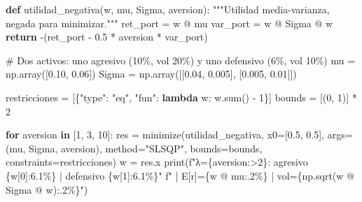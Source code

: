 \documentclass[
  spanish,
  letterpaper,
  DIV=11,
  numbers=noendperiod]{scrreprt}
\newenvironment{Shaded}{\begin{snugshade}}{\end{snugshade}}
\newcommand{\BuiltInTok}[1]{\textcolor[rgb]{0.00,0.23,0.31}{#1}}
\newcommand{\CommentTok}[1]{\textcolor[rgb]{0.37,0.37,0.37}{#1}}
\newcommand{\ControlFlowTok}[1]{\textcolor[rgb]{0.00,0.23,0.31}{\textbf{#1}}}
\newcommand{\DecValTok}[1]{\textcolor[rgb]{0.68,0.00,0.00}{#1}}
\newcommand{\FloatTok}[1]{\textcolor[rgb]{0.68,0.00,0.00}{#1}}
\newcommand{\KeywordTok}[1]{\textcolor[rgb]{0.00,0.23,0.31}{\textbf{#1}}}
\newcommand{\NormalTok}[1]{\textcolor[rgb]{0.00,0.23,0.31}{#1}}
\newcommand{\OperatorTok}[1]{\textcolor[rgb]{0.37,0.37,0.37}{#1}}
\newcommand{\SpecialCharTok}[1]{\textcolor[rgb]{0.37,0.37,0.37}{#1}}
\newcommand{\SpecialStringTok}[1]{\textcolor[rgb]{0.13,0.47,0.30}{#1}}
\newcommand{\StringTok}[1]{\textcolor[rgb]{0.13,0.47,0.30}{#1}}
\begin{document}
\label{minimize-restricciones}
\begin{Shaded}
\begin{Highlighting}[]
\KeywordTok{def}\NormalTok{ utilidad\_negativa(w, mu, Sigma, aversion):}
    \CommentTok{"""Utilidad media{-}varianza, negada para minimizar."""}
\NormalTok{    ret\_port }\OperatorTok{=}\NormalTok{ w }\OperatorTok{@}\NormalTok{ mu}
\NormalTok{    var\_port }\OperatorTok{=}\NormalTok{ w }\OperatorTok{@}\NormalTok{ Sigma }\OperatorTok{@}\NormalTok{ w}
    \ControlFlowTok{return} \OperatorTok{{-}}\NormalTok{(ret\_port }\OperatorTok{{-}} \FloatTok{0.5} \OperatorTok{*}\NormalTok{ aversion }\OperatorTok{*}\NormalTok{ var\_port)}

\CommentTok{\# Dos activos: uno agresivo (10\%, vol 20\%) y uno defensivo (6\%, vol 10\%)}
\NormalTok{mu }\OperatorTok{=}\NormalTok{ np.array([}\FloatTok{0.10}\NormalTok{, }\FloatTok{0.06}\NormalTok{])}
\NormalTok{Sigma }\OperatorTok{=}\NormalTok{ np.array([[}\FloatTok{0.04}\NormalTok{, }\FloatTok{0.005}\NormalTok{],}
\NormalTok{                  [}\FloatTok{0.005}\NormalTok{, }\FloatTok{0.01}\NormalTok{]])}

\NormalTok{restricciones }\OperatorTok{=}\NormalTok{ [\{}\StringTok{"type"}\NormalTok{: }\StringTok{"eq"}\NormalTok{, }\StringTok{"fun"}\NormalTok{: }\KeywordTok{lambda}\NormalTok{ w: w.}\BuiltInTok{sum}\NormalTok{() }\OperatorTok{{-}} \DecValTok{1}\NormalTok{\}]}
\NormalTok{bounds }\OperatorTok{=}\NormalTok{ [(}\DecValTok{0}\NormalTok{, }\DecValTok{1}\NormalTok{)] }\OperatorTok{*} \DecValTok{2}

\ControlFlowTok{for}\NormalTok{ aversion }\KeywordTok{in}\NormalTok{ [}\DecValTok{1}\NormalTok{, }\DecValTok{3}\NormalTok{, }\DecValTok{10}\NormalTok{]:}
\NormalTok{    res }\OperatorTok{=}\NormalTok{ minimize(utilidad\_negativa, x0}\OperatorTok{=}\NormalTok{[}\FloatTok{0.5}\NormalTok{, }\FloatTok{0.5}\NormalTok{],}
\NormalTok{                   args}\OperatorTok{=}\NormalTok{(mu, Sigma, aversion),}
\NormalTok{                   method}\OperatorTok{=}\StringTok{"SLSQP"}\NormalTok{, bounds}\OperatorTok{=}\NormalTok{bounds, constraints}\OperatorTok{=}\NormalTok{restricciones)}
\NormalTok{    w }\OperatorTok{=}\NormalTok{ res.x}
    \BuiltInTok{print}\NormalTok{(}\SpecialStringTok{f"λ=}\SpecialCharTok{\{}\NormalTok{aversion}\SpecialCharTok{:\textgreater{}2\}}\SpecialStringTok{: agresivo }\SpecialCharTok{\{}\NormalTok{w[}\DecValTok{0}\NormalTok{]}\SpecialCharTok{:6.1\%\}}\SpecialStringTok{ | defensivo }\SpecialCharTok{\{}\NormalTok{w[}\DecValTok{1}\NormalTok{]}\SpecialCharTok{:6.1\%\}}\SpecialStringTok{"}
          \SpecialStringTok{f" | E[r]=}\SpecialCharTok{\{}\NormalTok{w }\OperatorTok{@}\NormalTok{ mu}\SpecialCharTok{:.2\%\}}\SpecialStringTok{ | vol=}\SpecialCharTok{\{}\NormalTok{np}\SpecialCharTok{.}\NormalTok{sqrt(w }\OperatorTok{@}\NormalTok{ Sigma }\OperatorTok{@}\NormalTok{ w)}\SpecialCharTok{:.2\%\}}\SpecialStringTok{"}\NormalTok{)}
\end{Highlighting}
\end{Shaded}
\end{document}
